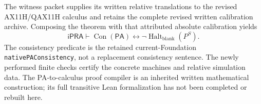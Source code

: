The witness packet supplies its written relative translations to the
revised AX11H/QAX11H calculus and retains the complete revised written
calibration archive.  Composing the theorem with that attributed
absolute calibration yields
\[
 \mathsf{iPRA}\vdash
 \operatorname{Con}(\mathsf{PA})
   \longleftrightarrow\neg\operatorname{Halt}_{\mathrm{blank}}(P^S).
\]
The consistency predicate is the retained current-Foundation
\texttt{nativePAConsistency}, not a replacement consistency sentence.
The newly performed finite checks certify the concrete machines and
relative simulation data.  The PA-to-calculus proof compiler is an
inherited written mathematical construction; its full transitive Lean
formalization has not been completed or rebuilt here.

